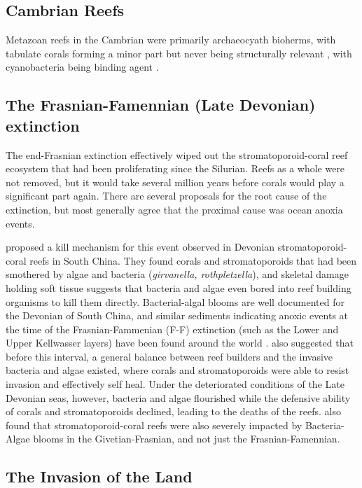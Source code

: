 \documentclass[11pt,a4paper]{article}
\begin{document}
\subsection{Cambrian Reefs}
Metazoan reefs in the Cambrian were primarily archaeocyath bioherms, with tabulate corals forming a minor part but never being structurally relevant \citep{Copper1994}, with cyanobacteria being  binding agent \citep{Lipps2016}. 

\subsection{The Frasnian-Famennian (Late Devonian) extinction}
The end-Frasnian extinction effectively wiped out the stromatoporoid-coral reef ecosystem that had been proliferating since the Silurian. Reefs as a whole were not removed, but it would take several million years before corals would play a significant part again. There are several proposals for the root cause of the extinction, but most generally agree that the proximal cause was ocean anoxia events.

\cite{WuFengGong2013} proposed a kill mechanism for this event observed in Devonian stromatoporoid-coral reefs in South China. They found corals and stromatoporoids that had been smothered by algae and bacteria (\textit{girvanella, rothpletzella}), and skeletal damage holding soft tissue suggests that bacteria and algae even bored into reef building organisms to kill them directly. Bacterial-algal blooms are well documented for the Devonian of South China, and similar sediments indicating anoxic events at the time of the Frasnian-Fammenian (F-F) extinction (such as the Lower and Upper  Kellwasser layers) have been found around the world \citep{Bond2005, House1985, Joachimski2001, Wendt1991}. %
\cite{WuFengGong2013} also suggested that before this interval, a general balance between reef builders and the invasive bacteria and algae existed, where corals and stromatoporoids were able to resist invasion and effectively self heal. Under the deteriorated conditions of the Late Devonian seas, however, bacteria and algae flourished while the defensive ability of corals and stromatoporoids declined, leading to the deaths of the reefs. \cite{WuFengGong2013} also found that stromatoporoid-coral reefs were also severely impacted by Bacteria-Algae blooms in the Givetian-Frasnian, and not just the Frasnian-Famennian.



\subsection{The Invasion of the Land}
\end{document}
